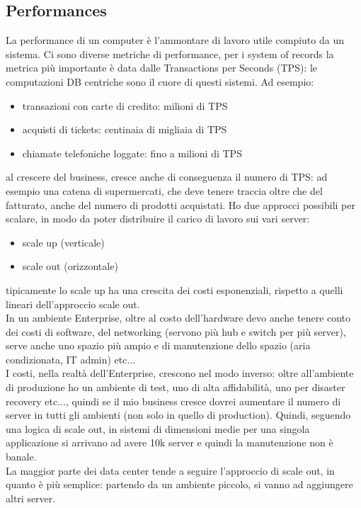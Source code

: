 \documentclass{article}
\begin{document}
\subsection{Performances}
La performance di un computer è l'ammontare di lavoro utile compiuto da un sistema. Ci sono diverse metriche di performance, per i system of records la metrica più importante è data dalle Transactions per Seconds (TPS): le computazioni DB centriche sono il cuore di questi sistemi. Ad esempio:
\begin{itemize}
\item transazioni con carte di credito: milioni di TPS
\item acquisti di tickets: centinaia di migliaia di TPS
\item chiamate telefoniche loggate: fino a milioni di TPS
\end{itemize}
al crescere del business, cresce anche di conseguenza il numero di TPS: ad esempio una catena di supermercati, che deve tenere traccia oltre che del fatturato, anche del numero di prodotti acquistati. Ho due approcci possibili per scalare, in modo da poter distribuire il carico di lavoro sui vari server:
\begin{itemize}
\item scale up (verticale)
\item scale out (orizzontale)
\end{itemize}
tipicamente lo scale up ha una crescita dei costi esponenziali, rispetto a quelli lineari dell'approccio scale out.\\ In un ambiente Enterprise, oltre al costo dell'hardware devo anche tenere conto dei costi di software, del networking (servono più hub e switch per più server), serve anche uno spazio più ampio e di manutenzione dello spazio (aria condizionata, IT admin) etc...\\ I costi, nella realtà dell'Enterprise, crescono nel modo inverso: oltre all'ambiente di produzione ho un ambiente di test, uno di alta affidabilità, uno per disaster recovery etc..., quindi se il mio business cresce dovrei aumentare il numero di server in tutti gli ambienti (non solo in quello di production). Quindi, seguendo una logica di scale out, in sistemi di dimensioni medie per una singola applicazione si arrivano ad avere 10k server e quindi la manutenzione non è banale.\\ La maggior parte dei data center tende a seguire l'approccio di scale out, in quanto è più semplice: partendo da un ambiente piccolo, si vanno ad aggiungere altri server.
\end{document}

